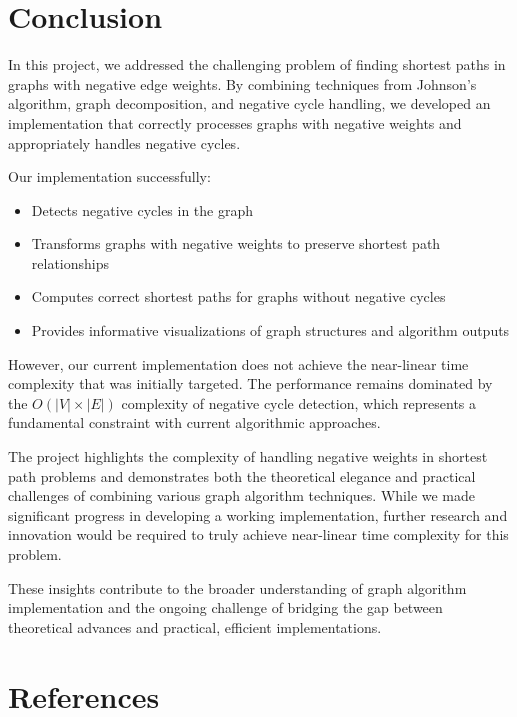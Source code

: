 \documentclass[11pt]{article}
\begin{document}
\section{Conclusion}

In this project, we addressed the challenging problem of finding shortest paths in graphs with negative edge weights. By combining techniques from Johnson's algorithm, graph decomposition, and negative cycle handling, we developed an implementation that correctly processes graphs with negative weights and appropriately handles negative cycles.

Our implementation successfully:
\begin{itemize}
    \item Detects negative cycles in the graph
    \item Transforms graphs with negative weights to preserve shortest path relationships
    \item Computes correct shortest paths for graphs without negative cycles
    \item Provides informative visualizations of graph structures and algorithm outputs
\end{itemize}

However, our current implementation does not achieve the near-linear time complexity that was initially targeted. The performance remains dominated by the $O(|V| \times |E|)$ complexity of negative cycle detection, which represents a fundamental constraint with current algorithmic approaches.

The project highlights the complexity of handling negative weights in shortest path problems and demonstrates both the theoretical elegance and practical challenges of combining various graph algorithm techniques. While we made significant progress in developing a working implementation, further research and innovation would be required to truly achieve near-linear time complexity for this problem.

These insights contribute to the broader understanding of graph algorithm implementation and the ongoing challenge of bridging the gap between theoretical advances and practical, efficient implementations.

\section{References}
\end{document}

